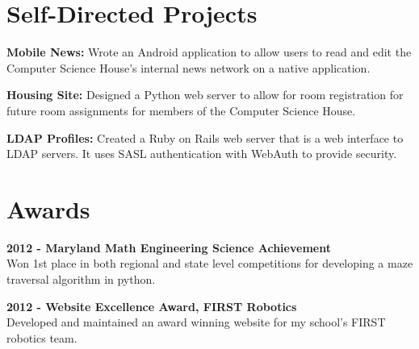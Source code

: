 \documentclass[10pt]{article} %
\begin{document}
{\begin{minipage}[t]{0.44\textwidth}

\section{Self-Directed Projects}
    \begin{sloppypar}
        {\bf Mobile News:} Wrote an Android application to allow users 
        to read and edit the Computer Science House's internal news network on a native 
        application. \\
    \end{sloppypar} 
    \begin{sloppypar}
        {\bf Housing Site:} Designed a Python web server to allow for room registration for
        future room assignments for members of the Computer Science House.\\
    \end{sloppypar}
    \begin{sloppypar}
        {\bf LDAP Profiles:} Created a Ruby on Rails web server that is a web interface to LDAP
        servers. It uses SASL authentication with WebAuth to provide security. \\
    \end{sloppypar}
    

\section{Awards} 

\begin{sloppypar}
    {\bf 2012 - Maryland Math Engineering Science Achievement \\}
    Won 1st place in both regional and state level competitions for 
    developing a maze traversal algorithm in python.
\end{sloppypar}

\bigskip

\begin{sloppypar}
    {\bf 2012 - Website Excellence Award, FIRST Robotics \\}
    Developed and maintained an award winning website for my school's FIRST 
    robotics team.
\end{sloppypar}


\end{minipage}}
\end{document}
